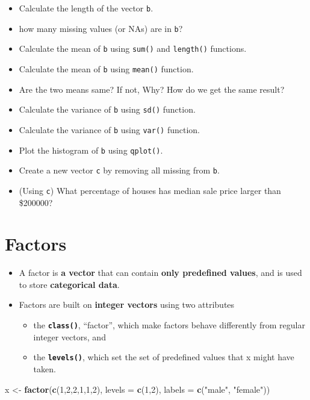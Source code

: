 \documentclass[]{book}
\newenvironment{Shaded}{\begin{snugshade}}{\end{snugshade}}
\newcommand{\KeywordTok}[1]{\textcolor[rgb]{0.13,0.29,0.53}{\textbf{{#1}}}}
\newcommand{\DataTypeTok}[1]{\textcolor[rgb]{0.13,0.29,0.53}{{#1}}}
\newcommand{\DecValTok}[1]{\textcolor[rgb]{0.00,0.00,0.81}{{#1}}}
\newcommand{\StringTok}[1]{\textcolor[rgb]{0.31,0.60,0.02}{{#1}}}
\newcommand{\NormalTok}[1]{{#1}}
\providecommand{\tightlist}{%
  \setlength{\itemsep}{0pt}\setlength{\parskip}{0pt}}
\begin{document}
\begin{itemize}
\item
  Calculate the length of the vector \texttt{b}.
\item
  how many missing values (or NAs) are in \texttt{b}?
\item
  Calculate the mean of \texttt{b} using \texttt{sum()} and
  \texttt{length()} functions.
\item
  Calculate the mean of \texttt{b} using \texttt{mean()} function.
\item
  Are the two means same? If not, Why? How do we get the same result?
\item
  Calculate the variance of \texttt{b} using \texttt{sd()} function.
\item
  Calculate the variance of \texttt{b} using \texttt{var()} function.
\item
  Plot the histogram of \texttt{b} using \texttt{qplot()}.
\item
  Create a new vector \texttt{c} by removing all missing from
  \texttt{b}.
\item
  (Using \texttt{c}) What percentage of houses has median sale price
  larger than \$200000?
\end{itemize}

\section{Factors}\label{factors}

\begin{itemize}
\tightlist
\item
  A factor is \textbf{a vector} that can contain \textbf{only predefined
  values}, and is used to store \textbf{categorical data}.
\item
  Factors are built on \textbf{integer vectors} using two attributes

  \begin{itemize}
  \tightlist
  \item
    the \textbf{\texttt{class()}}, ``factor'', which make factors behave
    differently from regular integer vectors, and
  \item
    the \textbf{\texttt{levels()}}, which set the set of predefined
    values that x might have taken.
  \end{itemize}
\end{itemize}

\begin{Shaded}
\begin{Highlighting}[]
\NormalTok{x <-}\StringTok{ }\KeywordTok{factor}\NormalTok{(}\KeywordTok{c}\NormalTok{(}\DecValTok{1}\NormalTok{,}\DecValTok{2}\NormalTok{,}\DecValTok{2}\NormalTok{,}\DecValTok{1}\NormalTok{,}\DecValTok{1}\NormalTok{,}\DecValTok{2}\NormalTok{), }\DataTypeTok{levels =} \KeywordTok{c}\NormalTok{(}\DecValTok{1}\NormalTok{,}\DecValTok{2}\NormalTok{), }\DataTypeTok{labels =} \KeywordTok{c}\NormalTok{(}\StringTok{"male"}\NormalTok{, }\StringTok{"female"}\NormalTok{))}
\end{Highlighting}
\end{Shaded}
\end{document}
